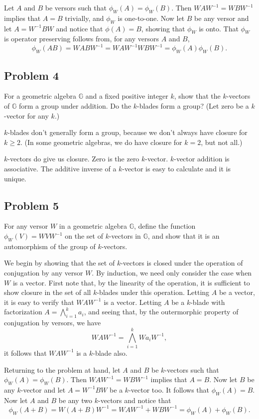 \documentclass[12pt]{article}
\newcommand{\G}{\mathbb{G}}
\begin{document}
Let $A$ and $B$ be versors such that $\phi_W(A)=\phi_W(B)$.
Then $WAW^{-1}=WBW^{-1}$ implies that $A=B$ trivially, and
$\phi_W$ is one-to-one.  Now let $B$ be any versor and
let $A=W^{-1}BW$ and notice that $\phi(A)=B$, showing that
$\phi_W$ is onto.  That $\phi_W$ is operator preserving follows
from, for any versors $A$ and $B$,
\begin{equation*}
\phi_W(AB)=WABW^{-1}=WAW^{-1}WBW^{-1}=\phi_W(A)\phi_W(B).
\end{equation*}

\subsection*{Problem 4}

For a geometric algebra $\G$ and a fixed positive integer $k$, show that the $k$-vectors of $\G$
form a group under addition.  Do the $k$-blades form a group?  (Let zero be a $k$-vector for any $k$.)

$k$-blades don't generally form a group, because we don't always have closure for $k\geq 2$.
(In some geometric algebras, we do have closure for $k=2$, but not all.)

$k$-vectors do give us closure.  Zero is the zero $k$-vector.  $k$-vector addition is associative.
The additive inverse of a $k$-vector is easy to calculate and it is unique.

\subsection*{Problem 5}

For any versor $W$ in a geometric algebra $\G$, define
the function $\phi_W(V)=WVW^{-1}$ on the set of $k$-vectors in $\G$,
and show that it is an automorphism of the group of $k$-vectors.

We begin by showing that the set of $k$-vectors is closed under
the operation of conjugation by any versor $W$.  By induction,
we need only consider the case when $W$ is a vector.
First note that, by the linearity of the operation, it is sufficient
to show closure in the set of all $k$-blades under this operation.
Letting $A$ be a vector, it is easy to verify that $WAW^{-1}$ is a vector.
Letting $A$ be a $k$-blade with factorization $A=\bigwedge_{i=1}^k a_i$,
and seeing that, by the outermorphic property of conjugation by versors,
we have
\begin{equation*}
WAW^{-1}=\bigwedge_{i=1}^k Wa_iW^{-1},
\end{equation*}
it follows that $WAW^{-1}$ is a $k$-blade also.

Returning to the problem at hand, let $A$ and $B$ be $k$-vectors such that $\phi_W(A)=\phi_W(B)$.
Then $WAW^{-1}=WBW^{-1}$ implies that $A=B$.  Now let $B$
be any $k$-vector and let $A=W^{-1}BW$ be a $k$-vector too.  It follows that $\phi_W(A)=B$.
Now let $A$ and $B$ be any two $k$-vectors and notice that
\begin{equation*}
\phi_W(A+B) = W(A+B)W^{-1} = WAW^{-1}+WBW^{-1} = \phi_W(A)+\phi_W(B).
\end{equation*}
\end{document}
